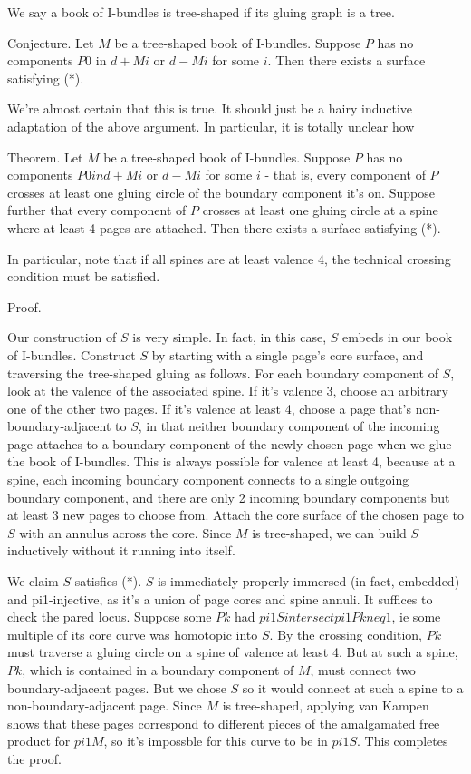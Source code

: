 \documentclass[12pt]{amsart}
\theoremstyle{definition}
\begin{document}
We say a book of I-bundles is tree-shaped if its gluing graph is a tree.

Conjecture. Let $M$ be a tree-shaped book of I-bundles. Suppose $P$ has no
components $P0$ in $d+Mi$ or $d-Mi$ for some $i$. Then there exists a surface
satisfying (*).

We're almost certain that this is true. It should just be a hairy inductive
adaptation of the above argument. In particular, it is totally unclear how

Theorem. Let $M$ be a tree-shaped book of I-bundles. Suppose $P$ has no components
$P0 in d+Mi$ or $d-Mi$ for some $i$ - that is, every component of $P$ crosses at least
one gluing circle of the boundary component it's on. Suppose further that every
component of $P$ crosses at least one gluing circle at a spine where at least
4 pages are attached. Then there exists a surface satisfying (*).

In particular, note that if all spines are at least valence 4, the technical
crossing condition must be satisfied.

Proof.

Our construction of $S$ is very simple. In fact, in this case, $S$ embeds in our
book of I-bundles. Construct $S$ by starting with a single page's core surface,
and traversing the tree-shaped gluing as follows. For each boundary component
of $S$, look at the valence of the associated spine. If it's valence 3, choose an
arbitrary one of the other two pages. If it's valence at least 4, choose a page
that's non-boundary-adjacent to $S$, in that neither boundary component of the
incoming page attaches to a boundary component of the newly chosen page when we
glue the book of I-bundles. This is always possible for valence at least 4,
because at a spine, each incoming boundary component connects to a single
outgoing boundary component, and there are only 2 incoming boundary components
but at least 3 new pages to choose from. Attach the core surface of the chosen
page to $S$ with an annulus across the core. Since $M$ is tree-shaped, we can build
$S$ inductively without it running into itself.

We claim $S$ satisfies (*). $S$ is immediately properly immersed (in fact,
embedded) and pi1-injective, as it's a union of page cores and spine annuli. It
suffices to check the pared locus. Suppose some $Pk$ had $pi1S intersect pi1Pk neq
1$, ie some multiple of its core curve was homotopic into $S$. By the crossing
condition, $Pk$ must traverse a gluing circle on a spine of valence at least 4.
But at such a spine, $Pk$, which is contained in a boundary component of $M$, must
connect two boundary-adjacent pages. But we chose $S$ so it would
connect at such a spine to a non-boundary-adjacent page. Since $M$ is
tree-shaped, applying van Kampen shows that these pages correspond to
different pieces of the amalgamated free product for $pi1M$, so it's impossble
for this curve to be in $pi1S$. This completes the proof.
\end{document}
